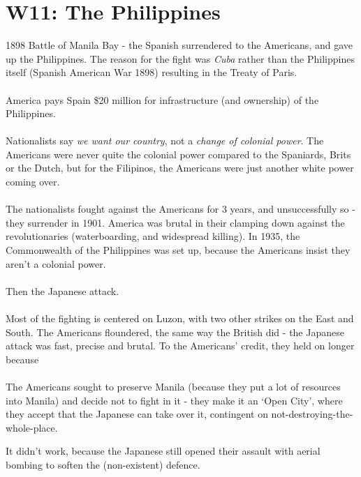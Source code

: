 \documentclass[a4paper]{article}
\begin{document}
\section{W11: The Philippines}
1898 Battle of Manila Bay - the Spanish surrendered to the Americans, and gave up the Philippines. The reason for the fight was \textit{Cuba} rather than the Philippines itself (Spanish American War 1898) resulting in the Treaty of Paris.\\
\\
America pays Spain \$20 million for infrastructure (and ownership) of the Philippines.\\
\\
Nationalists say \textit{we want our country}, not a \textit{change of colonial power}. The Americans were never quite the colonial power compared to the Spaniards, Brits or the Dutch, but for the Filipinos, the Americans were just another white power coming over.\\
\\
The nationalists fought against the Americans for 3 years, and unsuccessfully so - they surrender in 1901. America was brutal in their clamping down against the revolutionaries (waterboarding, and widespread killing). In 1935, the Commonwealth of the Philippines was set up, because the Americans insist they aren't a colonial power.\\
\\
Then the Japanese attack.\\
\\
Most of the fighting is centered on Luzon, with two other strikes on the East and South. The Americans floundered, the same way the British did - the Japanese attack was fast, precise and brutal. To the Americans' credit, they held on longer because\\
\\
The Americans sought to preserve Manila (because they put a lot of resources into Manila) and decide not to fight in it - they make it an `Open City', where they accept that the Japanese can take over it, contingent on not-destroying-the-whole-place.

\begin{framed}
	\begin{displayquote}
		It didn't work, because the Japanese still opened their assault with aerial bombing to soften the (non-existent) defence.
	\end{displayquote}
\end{framed}
\end{document}
